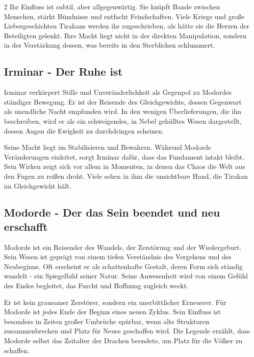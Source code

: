 \begin{multicols*}{2}
Ihr Einfluss ist subtil, aber allgegenwärtig.
Sie knüpft Bande zwischen Menschen, stärkt Bündnisse und entfacht Feindschaften.
Viele Kriege und große Liebesgeschichten Tirakans werden ihr zugeschrieben, als hätte sie die Herzen der Beteiligten gelenkt.
Ihre Macht liegt nicht in der direkten Manipulation, sondern in der Verstärkung dessen, was bereits in den Sterblichen schlummert.

\subsection{Irminar - Der Ruhe ist}\label{subsec:irminar-der-ruhe-ist}

Irminar verkörpert Stille und Unveränderlichkeit als Gegenpol zu Modordes ständiger Bewegung.
Er ist der Reisende des Gleichgewichts, dessen Gegenwart als unendliche Nacht empfunden wird.
In den wenigen Überlieferungen, die ihn beschreiben, wird er als ein schweigendes, in Nebel gehülltes Wesen dargestellt, dessen Augen die Ewigkeit zu durchdringen scheinen.

Seine Macht liegt im Stabilisieren und Bewahren.
Während Modorde Veränderungen einleitet, sorgt Irminar dafür, dass das Fundament intakt bleibt.
Sein Wirken zeigt sich vor allem in Momenten, in denen das Chaos die Welt aus den Fugen zu reißen droht.
Viele sehen in ihm die unsichtbare Hand, die Tirakan im Gleichgewicht hält.

\subsection{Modorde - Der das Sein beendet und neu erschafft}\label{subsec:modorde-der-das-sein-beendet-und-neu-erschafft}

Modorde ist ein Reisender des Wandels, der Zerstörung und der Wiedergeburt.
Sein Wesen ist geprägt von einem tiefen Verständnis des Vergehens und des Neubeginns.
Oft erscheint er als schattenhafte Gestalt, deren Form sich ständig wandelt - ein Spiegelbild seiner Natur.
Seine Anwesenheit wird von einem Gefühl des Endes begleitet, das Furcht und Hoffnung zugleich weckt.

Er ist kein grausamer Zerstörer, sondern ein unerbittlicher Erneuerer.
Für Modorde ist jedes Ende der Beginn eines neuen Zyklus.
Sein Einfluss ist besonders in Zeiten großer Umbrüche spürbar, wenn alte Strukturen zusammenbrechen und Platz für Neues geschaffen wird.
Die Legende erzählt, dass Modorde selbst das Zeitalter der Drachen beendete, um Platz für die Völker zu schaffen.



\end{multicols*}
